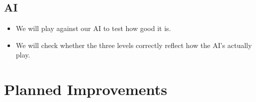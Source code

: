 \documentclass[]{article}
\begin{document}
\subsection{AI}
\begin{itemize}
\item We will play against our AI to test how good it is.
\item We will check whether the three levels correctly reflect how the AI's actually play.
\end{itemize}
\section{Planned Improvements}
\end{document}
